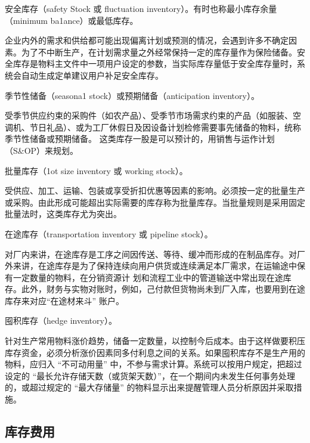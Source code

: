    \begin{enumerate.zh}
        \item 安全库存（safety Stock 或 ﬂuctuation inventory）。有时也称最小库存余量（minimum ba1ance）或最低库存。

        企业内外的需求和供给都可能出现偏离计划或预测的情况，会遇到许多不确定因素。为了不中断生产，在计划需求量之外经常保持一定的库存量作为保险储备。安全库存是物料主文件中一项用户设定的参数，当实际库存量低于安全库存量时，系统会自动生成定单建议用户补足安全库存。

        \item 季节性储备（seasona1 stock）或预期储备（anticipation inventory）。

         受季节供应约束的采购件（如农产品）、受季节市场需求约束的产品（如服装、空调机、节日礼品）、或为工厂休假日及因设备计划检修需要事先储备的物料，统称季节性储备或预期储备。 这类库存一股是可以预计的，用销售与运作计划（S\&OP）来规划。

        \item 批量库存（1ot size inventory 或 working stock）。

        受供应、加工、运输、包装或享受折扣优惠等因素的影响。必须按一定的批量生产或采购。由此形成可能超出实际需要的库存称为批量库存。当批量规则是采用固定批量法时，这类库存尤为突出。

        \item 在途库存（transportation inventory 或 pipeline stock）。

        对厂内来讲，在途库存是工序之间因传送、等待、缓冲而形成的在制品库存。对厂外来讲，在途库存是为了保持连续向用户供货或连续满足本厂需求，在运输途中保有一定数量的物料，在分销资源计
    划和流程工业中的管道输送中常出现在途库存。此外，财务与实物对账时，例如，己付款但货物尚未到厂入库，也要用到在途库存来对应“在途材来斗” 账户。

        \item 囤积库存（hedge inventory）。

        针对生产常用物料涨价趋势，储备一定数量，以控制今后成本。由于这样做要积压库存资金，必须分析涨价因素同多付利息之间的关系。如果囤积库存不是生产用的物料，应归入 “不可动用量” 中，不参与需求计算。系统可以按用户规定，把超过设定的 “最长允许存储天数（或货架天数）”，在一个期间内未发生任何事务处理的，或超过规定的 “最大存储量” 的物料显示出来提醒管理人员分析原因并采取措施。

    \end{enumerate.zh}
\subsection {库存费用}

